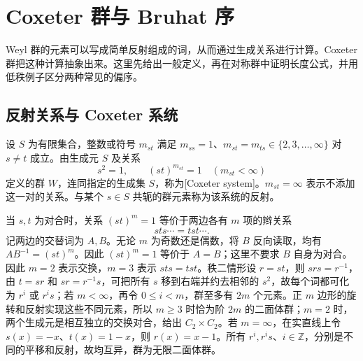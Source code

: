 %
%
\section{Coxeter 群与 Bruhat 序}
\label{b5:sec:A01}

Weyl 群的元素可以写成简单反射组成的词，从而通过生成关系进行计算。Coxeter 群把这种计算抽象出来。这里先给出一般定义，再在对称群中证明长度公式，并用低秩例子区分两种常见的偏序。

\subsection{反射关系与 Coxeter 系统}
\label{b5:subsec:A01:01}

\begin{definition}\label{b5:def:coxeter-system}
	设 \(S\) 为有限集合，整数或符号 \(m_{st}\) 满足 \(m_{ss}=1\)、\(m_{st}=m_{ts}\in\{2,3,\ldots,\infty\}\) 对 \(s\ne t\) 成立。由生成元 \(S\) 及关系
	\[
		s^2=1,\qquad (st)^{m_{st}}=1\quad(m_{st}<\infty)
	\]
	定义的群 \(W\)，连同指定的生成集 \(S\)，称为[Coxeter system]。\(m_{st}=\infty\) 表示不添加这一对的关系。与某个 \(s\in S\) 共轭的群元素称为该系统的反射。
\end{definition}

当 \(s,t\) 为对合时，关系 \((st)^m=1\) 等价于两边各有 \(m\) 项的辫关系
\[
	sts\cdots=tst\cdots.
\]
记两边的交替词为 \(A,B\)。无论 \(m\) 为奇数还是偶数，将 \(B\) 反向读取，均有 \(AB^{-1}=(st)^m\)。因此 \((st)^m=1\) 等价于 \(A=B\)；这里不要求 \(B\) 自身为对合。因此 \(m=2\) 表示交换，\(m=3\) 表示 \(sts=tst\)。秩二情形设 \(r=st\)，则 \(srs=r^{-1}\)，由 \(t=sr\) 和 \(sr=r^{-1}s\)，可把所有 \(s\) 移到右端并约去相邻的 \(s^2\)，故每个词都可化为 \(r^i\) 或 \(r^is\)；若 \(m<\infty\)，再令 \(0\le i<m\)，群至多有 \(2m\) 个元素。正 \(m\) 边形的旋转和反射实现这些不同元素，所以 \(m\ge3\) 时恰为阶 \(2m\) 的二面体群；\(m=2\) 时，两个生成元是相互独立的交换对合，给出 \(C_2\times C_2\)。若 \(m=\infty\)，在实直线上令 \(s(x)=-x\)、\(t(x)=1-x\)，则 \(r(x)=x-1\)。所有 \(r^i,r^is\)、\(i\in\mathbb Z\)，分别是不同的平移和反射，故均互异，群为无限二面体群。

